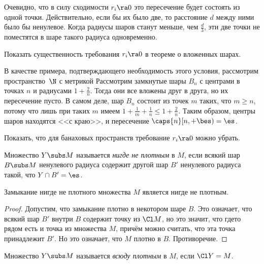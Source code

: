\documentclass[a4paper]{article}
\begin{document}
\begin{note}
Очевидно, что в силу сходимости $r_i \ra 0$ это пересечение будет состоять из одной точки.
Действительно, если бы их было две, то расстояние $d$ между ними было бы
ненулевое. Когда радиусы шаров станут меньше, чем $\frac d3$, эти две точки не поместятся
в шаре такого радиуса одновременно.
\end{note}

\begin{problem}
Показать существенность требования $r_i \ra 0$ в теореме о вложенных шарах.
\end{problem}
\begin{solution}
В качестве примера, подтверждающего необходимость этого условия, рассмотрим пространство~$\N$
с метрикой
Рассмотрим замкнутые шары  $B_n$ с центрами в точках $n$ и радиусами $1+\frac{2}{n}$. Тогда они все
вложены друг в друга, но их пересечение пусто. В самом деле, шар $B_n$ состоит из точек $m$ таких, что $m \ge n$,
потому что лишь при таких $m$ имеем $1 + \frac1m+\frac1n \le 1 + \frac2n$. Таким образом, центры шаров
находятся <<с краю>>, и пересечение $\caps{n}[n,+\bes)=\es$.
\end{solution}



\begin{problem}
Показать, что для банаховых пространств требование $r_i \ra 0$ можно убрать.
\end{problem}

\begin{df}
Множество $Y \subs M$ называется \emph{нигде не плотным} в $M$, если всякий шар $B \subs M$ ненулевого радиуса
содержит другой шар $B'$ ненулевого радиуса такой, что $Y \cap B' = \es$.
\end{df}

\begin{stm}
Замыкание нигде не плотного множества $M$ является нигде не плотным.
\end{stm}
\begin{proof}
Допустим, что замыкание плотно в некотором шаре $B$. Это означает,
что всякий шар $B'$ внутри $B$ содержит точку из $\Cl M$, но это значит, что где\д то рядом
есть и точка из множества $M$, причём можно считать, что эта точка принадлежит $B'$.
Но это означает, что $M$ плотно в $B$. Противоречие.
\end{proof}

\begin{df}
Множество $Y \subs M$ называется \emph{всюду плотным} в $M$, если $\Cl Y = M$.
\end{df}
\end{document}
